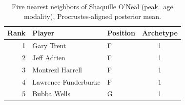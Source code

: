 \begin{table}[htbp]
  \centering\small
  \begin{tabular}{rllc}
    \toprule
    Rank & Player & Position & Archetype \\
    \midrule
    1 & Gary Trent & F & 1 \\
    2 & Jeff Adrien & F & 1 \\
    3 & Montrezl Harrell & F & 1 \\
    4 & Lawrence Funderburke & F & 1 \\
    5 & Bubba Wells & G & 1 \\
    \bottomrule
  \end{tabular}
  \caption{Five nearest neighbors of Shaquille O'Neal (peak_age modality), Procrustes-aligned posterior mean.}
  \label{tab:Shaquille_O_Neal_neighbors_peak_age}
\end{table}

